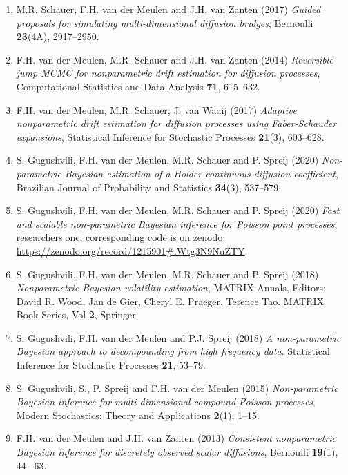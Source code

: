 \documentclass[
10pt, %
a4paper, %
oneside, %
headinclude,footinclude, %
BCOR5mm, %
]{scrartcl}
\begin{document}
\begin{enumerate}
\item {\sc M.R. Schauer, F.H.  van der Meulen and J.H. van Zanten (2017)} {\it  Guided proposals for simulating multi-dimensional diffusion bridges}, Bernoulli {\bf 23}(4A), 2917--2950.

\item {\sc F.H. van der Meulen, M.R. Schauer and J.H. van Zanten (2014)} {\it  Reversible jump MCMC for nonparametric drift estimation for diffusion processes}, Computational Statistics and Data Analysis {\bf 71}, 615--632.

\item {\sc F.H. van der Meulen, M.R. Schauer, J. van Waaij (2017)} {\it   Adaptive nonparametric drift estimation for diffusion processes using Faber-Schauder expansions},  Statistical Inference for Stochastic Processes {\bf 21}(3), 603--628.

\item {\sc S. Gugushvili, F.H. van der Meulen, M.R. Schauer and P. Spreij (2020)} {\it  Non-parametric Bayesian estimation of a Holder continuous diffusion coefficient}, Brazilian Journal of Probability and Statistics {\bf 34}(3), 537--579. 

\item {\sc S. Gugushvili, F.H. van der Meulen, M.R. Schauer and P. Spreij (2020)} {\it  Fast and scalable non-parametric Bayesian inference for Poisson point processes}, \url{researchers.one}, corresponding code is on zenodo \url{https://zenodo.org/record/1215901#.Wtg3N9NuZTY}.

\item {\sc S. Gugushvili, F.H. van der Meulen, M.R. Schauer and P. Spreij (2018)} {\it  Nonparametric Bayesian volatility estimation}, MATRIX Annals, Editors: David R. Wood, Jan de Gier, Cheryl E. Praeger, Terence Tao. MATRIX Book Series, Vol {\bf 2}, Springer.

\item {\sc S. Gugushvili, F.H. van der Meulen and P.J. Spreij (2018)} {\it  A non-parametric Bayesian approach to decompounding from high frequency data}. Statistical Inference for Stochastic Processes {\bf 21}, 53--79.

\item {\sc S. Gugushvili, S., P. Spreij and F.H. van der Meulen (2015)} {\it  Non-parametric Bayesian inference for multi-dimensional compound Poisson processes}, Modern Stochastics: Theory and Applications {\bf 2}(1), 1--15.

\item {\sc F.H. van der Meulen and J.H. van Zanten (2013)} {\it  Consistent nonparametric Bayesian inference for discretely observed scalar diffusions}, Bernoulli {\bf 19}(1), 44–-63.


\end{enumerate}
\end{document}
